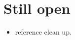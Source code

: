 \documentclass[
reprint,
amsmath,amssymb,amsfonts,clevref,
aps,
prstab,
]{revtex4-2}
\begin{document}
\section{Still open}
	\begin{itemize}
	\item reference clean up.
\end{itemize}
	
	
	
	

	\newpage{\pagestyle{empty}\cleardoublepage}
	
\end{document}
